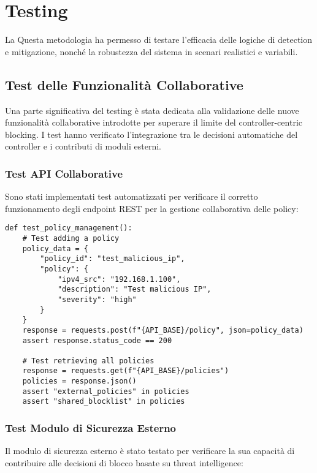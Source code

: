 \chapter{Testing}

La Questa metodologia ha permesso di testare l'efficacia delle logiche di detection e mitigazione, nonché la robustezza del sistema in scenari realistici e variabili.

\section{Test delle Funzionalità Collaborative}

Una parte significativa del testing è stata dedicata alla validazione delle nuove funzionalità collaborative introdotte per superare il limite del controller-centric blocking. I test hanno verificato l'integrazione tra le decisioni automatiche del controller e i contributi di moduli esterni.

\subsection{Test API Collaborative}
Sono stati implementati test automatizzati per verificare il corretto funzionamento degli endpoint REST per la gestione collaborativa delle policy:

\begin{verbatim}
def test_policy_management():
    # Test adding a policy
    policy_data = {
        "policy_id": "test_malicious_ip",
        "policy": {
            "ipv4_src": "192.168.1.100",
            "description": "Test malicious IP",
            "severity": "high"
        }
    }
    response = requests.post(f"{API_BASE}/policy", json=policy_data)
    assert response.status_code == 200
    
    # Test retrieving all policies
    response = requests.get(f"{API_BASE}/policies")
    policies = response.json()
    assert "external_policies" in policies
    assert "shared_blocklist" in policies
\end{verbatim}

\subsection{Test Modulo di Sicurezza Esterno}
Il modulo di sicurezza esterno è stato testato per verificare la sua capacità di contribuire alle decisioni di blocco basate su threat intelligence:

